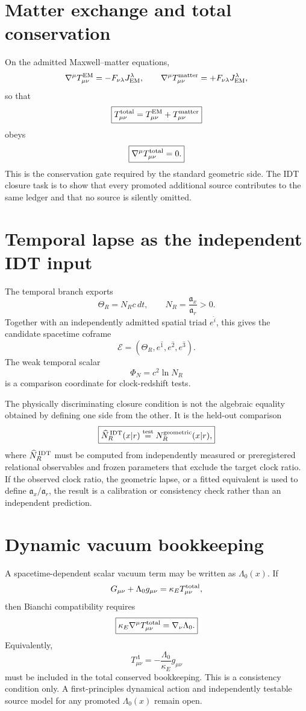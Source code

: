 \section{Matter exchange and total conservation}

On the admitted Maxwell--matter equations,
\[
\nabla^\mu T^{\rm EM}_{\mu\nu}
=-F_{\nu\lambda}J_{\rm EM}^{\lambda},
\qquad
\nabla^\mu T^{\rm matter}_{\mu\nu}
=+F_{\nu\lambda}J_{\rm EM}^{\lambda},
\]
so that
\[
\boxed{
T^{\rm total}_{\mu\nu}
=T^{\rm EM}_{\mu\nu}+T^{\rm matter}_{\mu\nu}
}
\]
obeys
\[
\boxed{\nabla^\mu T^{\rm total}_{\mu\nu}=0.}
\]
This is the conservation gate required by the standard geometric side. The IDT closure task is to show that every promoted additional source contributes to the same ledger and that no source is silently omitted.

\section{Temporal lapse as the independent IDT input}

The temporal branch exports
\[
\Theta_R=N_Rc\,dt,
\qquad
N_R=\frac{\mathfrak a_x}{\mathfrak a_r}>0.
\]
Together with an independently admitted spatial triad \(e^{\hat i}\), this gives the candidate spacetime coframe
\[
\mathcal E=(\Theta_R,e^{\hat1},e^{\hat2},e^{\hat3}).
\]
The weak temporal scalar
\[
\Phi_N=c^2\ln N_R
\]
is a comparison coordinate for clock-redshift tests.

The physically discriminating closure condition is not the algebraic equality obtained by defining one side from the other. It is the held-out comparison
\[
\boxed{
\widehat N_R^{\,\rm IDT}(x|r)
\stackrel{\rm test}{=}
N_R^{\rm geometric}(x|r),
}
\]
where \(\widehat N_R^{\,\rm IDT}\) must be computed from independently measured or preregistered relational observables and frozen parameters that exclude the target clock ratio. If the observed clock ratio, the geometric lapse, or a fitted equivalent is used to define \(\mathfrak a_x/\mathfrak a_r\), the result is a calibration or consistency check rather than an independent prediction.

\section{Dynamic vacuum bookkeeping}

A spacetime-dependent scalar vacuum term may be written as \(\Lambda_0(x)\). If
\[
G_{\mu\nu}+\Lambda_0g_{\mu\nu}
=
\kappa_E T^{\rm total}_{\mu\nu},
\]
then Bianchi compatibility requires
\[
\boxed{
\kappa_E\nabla^\mu T^{\rm total}_{\mu\nu}
=
\nabla_\nu\Lambda_0.
}
\]
Equivalently,
\[
T^\Lambda_{\mu\nu}
=-\frac{\Lambda_0}{\kappa_E}g_{\mu\nu}
\]
must be included in the total conserved bookkeeping. This is a consistency condition only. A first-principles dynamical action and independently testable source model for any promoted \(\Lambda_0(x)\) remain open.

